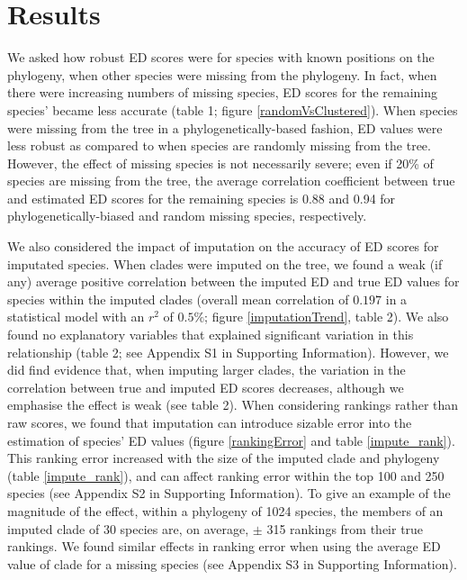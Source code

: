 \documentclass[10pt,english]{article}
\begin{document}
\section*{Results}
We asked how robust ED scores were for species with known positions on the
phylogeny, when other species were missing from the phylogeny. In fact, when
there were increasing numbers of missing species, ED scores for the remaining
species’ became less accurate (table 1; figure \ref{randomVsClustered}). When
species were missing from the tree in a phylogenetically-based fashion, ED
values were less robust as compared to when species are randomly missing from
the tree. However, the effect of missing species is not necessarily severe; even
if 20\% of species are missing from the tree, the average correlation
coefficient between true and estimated ED scores for the remaining species is
0.88 and 0.94 for phylogenetically-biased and random missing species,
respectively.

We also considered the impact of imputation on the accuracy of ED scores for
imputated species. When clades were imputed on the tree, we found a weak (if
any) average positive correlation between the imputed ED and true ED values for
species within the imputed clades (overall mean correlation of $0.197$ in a
statistical model with an $r^2$ of $0.5\%$; figure \ref{imputationTrend}, table
2). We also found no explanatory variables that explained significant variation
in this relationship (table 2; see Appendix S1 in Supporting Information).
However, we did find evidence that, when imputing larger clades, the variation
in the correlation between true and imputed ED scores decreases, although we
emphasise the effect is weak (see table 2). When considering rankings rather
than raw scores, we found that imputation can introduce sizable error into the
estimation of species' ED values (figure \ref{rankingError} and table
\ref{impute_rank}). This ranking error increased with the size of the imputed
clade and phylogeny (table \ref{impute_rank}), and can affect ranking error
within the top 100 and 250 species (see Appendix S2 in Supporting Information).
To give an example of the magnitude of the effect, within a phylogeny of 1024
species, the members of an imputed clade of 30 species are, on average, $\pm$
315 rankings from their true rankings. We found similar effects in ranking error
when using the average ED value of clade for a missing species (see Appendix S3
in Supporting Information).
\end{document}

